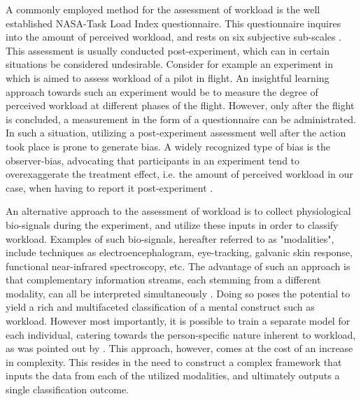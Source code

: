 \documentclass[12pt]{article}
\begin{document}
A commonly employed method for the assessment of workload is the well established NASA-Task Load Index questionnaire. This questionnaire inquires into the amount of perceived workload, and rests on six subjective sub-scales \cite{hart2006nasa}. This assessment is usually conducted post-experiment, which can in certain situations be considered undesirable. Consider for example an experiment in which is aimed to assess workload of a pilot in flight. An insightful learning approach towards such an experiment would be to measure the degree of perceived workload at different phases of the flight. However, only after the flight is concluded, a measurement in the form of a questionnaire can be administrated. In such a situation, utilizing a post-experiment assessment well after the action took place is prone to generate bias. A widely recognized type of bias is the observer-bias, advocating that participants in an experiment tend to overexaggerate the treatment effect, i.e. the amount of perceived workload in our case, when having to report it post-experiment \cite{mahtani2018catalogue}.

An alternative approach to the assessment of workload is to collect physiological bio-signals during the experiment, and utilize these inputs in order to classify workload. Examples of such bio-signals, hereafter referred to as "modalities", include techniques as electroencephalogram, eye-tracking, galvanic skin response, functional near-infrared spectroscopy, etc. The advantage of such an approach is that complementary information streams, each stemming from a different modality, can all be interpreted simultaneously \cite{ramachandram2017deep}. Doing so poses the potential to yield a rich and multifaceted classification of a mental construct such as workload. However most importantly, it is possible to train a separate model for each individual, catering towards the person-specific nature inherent to workload, as was pointed out by . This approach, however, comes at the cost of an increase in complexity. This resides in the need to construct a complex framework that inputs the data from each of the utilized modalities, and ultimately outputs a single classification outcome. 
\end{document}

